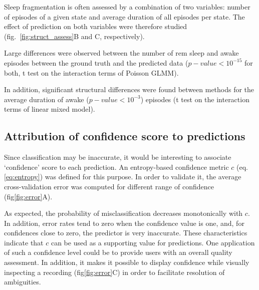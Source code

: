 Sleep fragmentation is often assessed by a combination of two variables: number of episodes of a given state 
and average duration of all episodes per state\cite{pang_unexpected_2009}. The
effect of prediction on both variables were therefore studied (fig.~\ref{fig:struct_assess}B and C,
respectively).

Large differences were observed between the number of \gls{rem} sleep and awake episodes between the ground truth and the predicted data
($p-value < 10^{-15}$ for both, t test on the interaction terms of Poisson GLMM).

In addition, significant structural differences were found between methods for the average duration of awake ($p-value < 10^{-3}$) episodes 
(t test on the interaction terms of linear mixed model). 

\subsection{Attribution of confidence score to predictions}

Since classification may be inaccurate, it would be interesting to associate `confidence' score to each prediction.
An entropy-based confidence metric $c$ (eq. \ref{eq:entropy}) was defined for this purpose.
In order to validate it, the average cross-validation error was computed for different range of confidence (fig\ref{fig:error}A).



As expected, the probability of misclassification decreases monotonically with $c$.
In addition, error rates tend to zero when the confidence value is one, and, for confidences close to zero, the predictor is very inaccurate.
These characteristics indicate that $c$ can be used as a supporting value for predictions.
One application of such a confidence level could be to provide users with an overall quality assessment.
In addition, it  makes it possible to display confidence while visually inspecting a recording (fig\ref{fig:error}C) in order to facilitate resolution of ambiguities.


